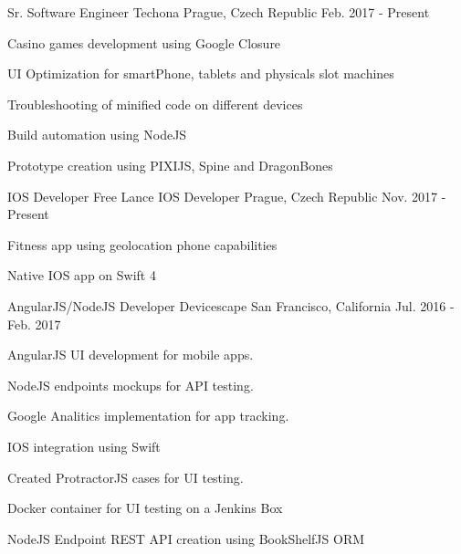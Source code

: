 

\begin{cventries}

 \cventry
      {Sr. Software Engineer} %
      {Techona} %
      {Prague, Czech Republic} %
      {Feb. 2017 - Present} %
      {
        \begin{cvitems} %
          \item {Casino games development using Google Closure}
          \item {UI Optimization for smartPhone, tablets and physicals slot machines}
          \item {Troubleshooting of minified code on different devices}
          \item {Build automation using NodeJS}
          \item {Prototype creation using PIXIJS, Spine and DragonBones}
        \end{cvitems}
      }

 \cventry
      {IOS Developer} %
      {Free Lance IOS Developer} %
      {Prague, Czech Republic} %
      {Nov. 2017 - Present} %
      {
        \begin{cvitems} %
          \item {Fitness app using geolocation phone capabilities}
          \item {Native IOS app on Swift 4}
        \end{cvitems}
      }

  \cventry
      {AngularJS/NodeJS Developer} %
      {Devicescape} %
      {San Francisco, California} %
      {Jul. 2016 - Feb. 2017} %
      {
        \begin{cvitems} %
          \item {AngularJS UI development for mobile apps.}
          \item {NodeJS endpoints mockups for API testing.}
          \item {Google Analitics implementation for app tracking.}
          \item {IOS integration using Swift}
          \item {Created ProtractorJS cases for UI testing.}
          \item {Docker container for UI testing on a Jenkins Box}
          \item {NodeJS Endpoint REST API creation using BookShelfJS ORM}
        \end{cvitems}
      }



\end{cventries}
